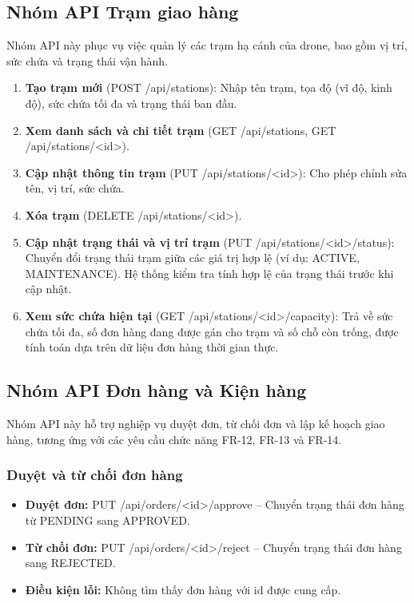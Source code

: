 \subsection{Nhóm API Trạm giao hàng}

Nhóm API này phục vụ việc quản lý các trạm hạ cánh của drone, bao gồm vị trí, sức chứa và trạng thái vận hành.

\begin{enumerate}
\def\labelenumi{\arabic{enumi}.}
\item
  \textbf{Tạo trạm mới} (POST /api/stations): Nhập tên trạm, tọa độ (vĩ độ, kinh độ), sức chứa tối đa và trạng thái ban đầu.
\item
  \textbf{Xem danh sách và chi tiết trạm} (GET /api/stations, GET /api/stations/<id>).
\item
  \textbf{Cập nhật thông tin trạm} (PUT /api/stations/<id>): Cho phép chỉnh sửa tên, vị trí, sức chứa.
\item
  \textbf{Xóa trạm} (DELETE /api/stations/<id>).
\item
  \textbf{Cập nhật trạng thái và vị trí trạm} (PUT /api/stations/<id>/status): Chuyển đổi trạng thái trạm giữa các giá trị hợp lệ (ví dụ: ACTIVE, MAINTENANCE). Hệ thống kiểm tra tính hợp lệ của trạng thái trước khi cập nhật.
\item
  \textbf{Xem sức chứa hiện tại} (GET /api/stations/<id>/capacity): Trả về sức chứa tối đa, số đơn hàng đang được gán cho trạm và số chỗ còn trống, được tính toán dựa trên dữ liệu đơn hàng thời gian thực.
\end{enumerate}

\subsection{Nhóm API Đơn hàng và Kiện hàng}

Nhóm API này hỗ trợ nghiệp vụ duyệt đơn, từ chối đơn và lập kế hoạch giao hàng, tương ứng với các yêu cầu chức năng FR-12, FR-13 và FR-14.

\subsubsection{Duyệt và từ chối đơn hàng}

\begin{itemize}
\item
  \textbf{Duyệt đơn:} PUT /api/orders/<id>/approve -- Chuyển trạng thái đơn hàng từ PENDING sang APPROVED.
\item
  \textbf{Từ chối đơn:} PUT /api/orders/<id>/reject -- Chuyển trạng thái đơn hàng sang REJECTED.
\item
  \textbf{Điều kiện lỗi:} Không tìm thấy đơn hàng với id được cung cấp.
\end{itemize}

